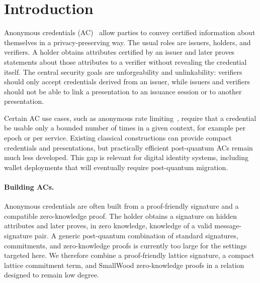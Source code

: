 \section{Introduction}
\label{sec:intro}

Anonymous credentials (AC)~\cite{chaum85-anonymous-credentials,EC:Brands95,EC:CamLys01} allow parties to
convey certified information about themselves in a privacy-preserving way.  The usual roles are issuers,
holders, and verifiers.  A holder obtains attributes certified by an issuer and later proves statements about
those attributes to a verifier without revealing the credential itself.  The central security goals are
unforgeability and unlinkability: verifiers should only accept credentials derived from an issuer, while issuers
and verifiers should not be able to link a presentation to an issuance session or to another presentation.

Certain AC use cases, such as anonymous rate limiting~\cite{ietf-privacypass-arc-protocol-01,schlesinger-cfrg-act-00},
require that a credential be usable only a bounded number of times in a given context, for example per
epoch or per service.  Existing classical constructions can provide compact credentials and presentations, but
practically efficient post-quantum ACs remain much less developed.  This gap is relevant for digital identity
systems, including wallet deployments that will eventually require post-quantum migration.

\paragraph*{Building ACs.}
Anonymous credentials are often built from a proof-friendly signature and a compatible zero-knowledge proof.
The holder obtains a signature on hidden attributes and later proves, in zero knowledge, knowledge of a valid
message-signature pair.  A generic post-quantum combination of standard signatures, commitments, and
zero-knowledge proofs is currently too large for the settings targeted here.  We therefore combine a proof-friendly
lattice signature, a compact lattice commitment term, and SmallWood zero-knowledge proofs in a relation designed
to remain low degree.

